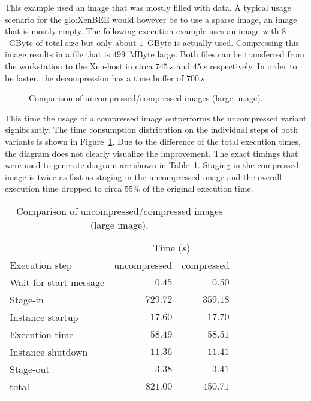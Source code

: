 This example  used an image that  was mostly filled with  data.  A typical
usage scenario for  the \gls{glo:XenBEE} would however be  to use a sparse
image, \ie an image that  is mostly empty. The following execution example
uses an  image with $8$~GByte  of total size  but only about  $1$~GByte is
actually  used.   Compressing  this  image  results  in  a  file  that  is
$499$~MByte large. Both  files can be transferred from  the workstation to
the Xen-host in  circa $745\ s$ and $45\ s$ respectively.   In order to be
faster, the decompression has a time buffer of $700\ s$.

\begin{figure}[ht]
  \label{fig:compression-comparison-big}
  \caption[Uncompressed \vs compressed large images]{Comparison of uncompressed/compressed images (large image).}
\end{figure}

This time  the usage  of a compressed  image outperforms  the uncompressed
variant significantly. The time consumption distribution on the individual
steps        of       both        variants        is       shown        in
Figure~\ref{fig:compression-comparison-big}. Due to  the difference of the
total  execution  times,  the  diagram  does  not  clearly  visualize  the
improvement.  The  exact timings  that were used  to generate  diagram are
shown  in   Table~\ref{tab:compression-comparison-big}.   Staging  in  the
compressed image is twice as fast as staging in the uncompressed image and
the  overall  execution time  dropped  to  circa  $55\%$ of  the  original
execution time.

\begin{table}[ht]
  \centering
  \begin{tabular}{@{}lrr@{}}\toprule
                      & \multicolumn{2}{c}{Time ($s$)} \\ \cmidrule(lr){2-3}
    Execution step         &  uncompressed      & compressed \\ \midrule %
    Wait for start message &   $   0.45 $       & $   0.50 $    \\
    Stage-in               &   $ 729.72 $       & $ 359.18 $    \\
    Instance startup       &   $  17.60 $       & $  17.70 $    \\
    Execution time         &   $  58.49 $       & $  58.51 $    \\
    Instance shutdown      &   $  11.36 $       & $  11.41 $    \\
    Stage-out              &   $   3.38 $       & $   3.41 $    \\
    total                  &   $ 821.00 $       & $ 450.71 $    \\
    \bottomrule
  \end{tabular}
  \caption[Uncompressed \vs compressed large images]{Comparison of uncompressed/compressed images (large image).}
  \label{tab:compression-comparison-big}
\end{table}

